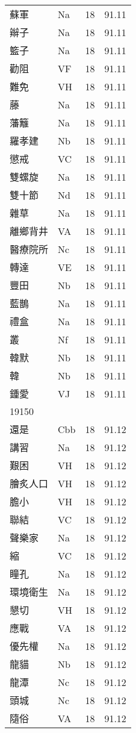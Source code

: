 \documentclass[twocolumn]{book}
\begin{document}
\begin{supertabular}{llrr}
蘇軍 & Na & 18 &  91.11\\
辮子 & Na & 18 &  91.11\\
籃子 & Na & 18 &  91.11\\
勸阻 & VF & 18 &  91.11\\
難免 & VH & 18 &  91.11\\
藤 & Na & 18 &  91.11\\
藩籬 & Na & 18 &  91.11\\
羅孝建 & Nb & 18 &  91.11\\
懲戒 & VC & 18 &  91.11\\
雙螺旋 & Na & 18 &  91.11\\
雙十節 & Nd & 18 &  91.11\\
雜草 & Na & 18 &  91.11\\
離鄉背井 & VA & 18 &  91.11\\
醫療院所 & Nc & 18 &  91.11\\
轉達 & VE & 18 &  91.11\\
豐田 & Nb & 18 &  91.11\\
藍鵲 & Na & 18 &  91.11\\
禮盒 & Na & 18 &  91.11\\
叢 & Nf & 18 &  91.11\\
韓默 & Nb & 18 &  91.11\\
韓 & Nb & 18 &  91.11\\
鍾愛 & VJ & 18 &  91.11\\
19150\\
還是 & Cbb & 18 &  91.12\\
講習 & Na & 18 &  91.12\\
艱困 & VH & 18 &  91.12\\
膾炙人口 & VH & 18 &  91.12\\
膽小 & VH & 18 &  91.12\\
聯結 & VC & 18 &  91.12\\
聲樂家 & Na & 18 &  91.12\\
縮 & VC & 18 &  91.12\\
瞳孔 & Na & 18 &  91.12\\
環境衛生 & Na & 18 &  91.12\\
懇切 & VH & 18 &  91.12\\
應戰 & VA & 18 &  91.12\\
優先權 & Na & 18 &  91.12\\
龍貓 & Nb & 18 &  91.12\\
龍潭 & Nc & 18 &  91.12\\
頭城 & Nc & 18 &  91.12\\
隨俗 & VA & 18 &  91.12\\

\end{supertabular}
\end{document}
